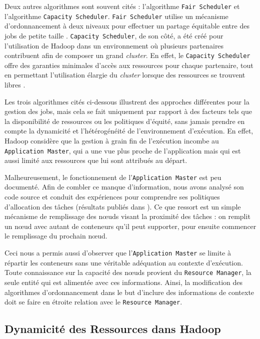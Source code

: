 Deux autres algorithmes sont souvent cités : l'algorithme \texttt{Fair Scheduler} et l'algorithme \texttt{Capacity Scheduler}. \texttt{Fair Scheduler} utilise un mécanisme d'ordonnancement à deux niveaux pour effectuer un partage équitable entre des jobs de petite taille \cite{Hadoop}. \texttt{Capacity Scheduler}, de son côté, a été créé pour l'utilisation de Hadoop dans un environnement où plusieurs partenaires contribuent afin de composer un grand \textit{cluster}. En effet, le \texttt{Capacity Scheduler} offre des garanties minimales d'accès aux ressources pour chaque partenaire, tout en permettant l'utilisation élargie du \textit{cluster} lorsque des ressources se trouvent libres \cite{Hadoop}.

Les trois algorithmes cités ci-dessous illustrent des approches différentes pour la gestion des jobs, mais cela se fait uniquement par rapport à des facteurs tels que la disponibilité de ressources ou les politiques d'équité, sans jamais prendre en compte la dynamicité et l'hétérogénéité de l'environnement d'exécution. En effet, Hadoop considère que la gestion à grain fin de l'exécution incombe au  \texttt{Application Master}, qui a une vue plus proche de l'application mais qui est aussi limité aux ressources que lui sont attribués au départ.

Malheureusement, le fonctionnement de l'\texttt{Application Master} est peu documenté. Afin de combler ce manque d'information, nous avons analysé son code source et conduit des expériences pour comprendre ses politiques d'allocation des tâches (résultats publiés dans \cite{UBICOMM2014}). Ce que ressort est un simple mécanisme de remplissage des n{\oe}uds visant la proximité des tâches : on remplit un n{\oe}ud avec autant de conteneurs qu'il peut supporter, pour ensuite commencer le remplissage du prochain n{\oe}ud.   

Ceci nous a permis aussi d'observer que l'\texttt{Application Master} se limite à répartir les conteneurs sans une véritable adéquation au contexte d'exécution. Toute connaissance sur la capacité des n{\oe}uds provient du \texttt{Resource Manager}, la seule entité qui est alimentée avec ces informations. Ainsi, la modification des algorithmes d'ordonnancement dans le but d'inclure des informations de contexte doit se faire en étroite relation avec le \texttt{Resource Manager}.



\subsection{Dynamicité des Ressources dans Hadoop} \label{sec:related}

